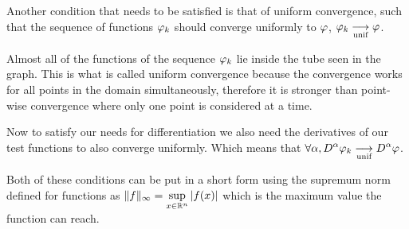 \documentclass[11pt, openright]{book}
\begin{document}
\begin{minipage}{\textwidth}
    \begin{wrapfigure}{r}{5cm}
    \end{wrapfigure}
    Another condition that needs to be satisfied is that of uniform convergence, such that the sequence of functions $\displaystyle{\varphi_k}$ should converge uniformly to $\displaystyle{\varphi}$, $\displaystyle{\varphi_k \underset{\text{unif}}{\longrightarrow} \varphi}$.

    Almost all of the functions of the sequence $\displaystyle{\varphi_k}$ lie inside the tube seen in the graph. This is what is called uniform convergence because the convergence works for all points in the domain simultaneously, therefore it is stronger than point-wise convergence where only one point is considered at a time.
\end{minipage}
Now to satisfy our needs for differentiation we also need the derivatives of our test functions to also converge uniformly. Which means that $\displaystyle{\forall \alpha, D^\alpha \varphi_k  \underset{\text{unif}}{\longrightarrow} D^\alpha \varphi }$.

Both of these conditions can be put in a short form using the supremum norm defined for functions as $\displaystyle{\|f\|_{\infty}=\sup_{x \in \mathbb{R}^n} |f(x)|}$ which is the maximum value the function can reach.
\end{document}
